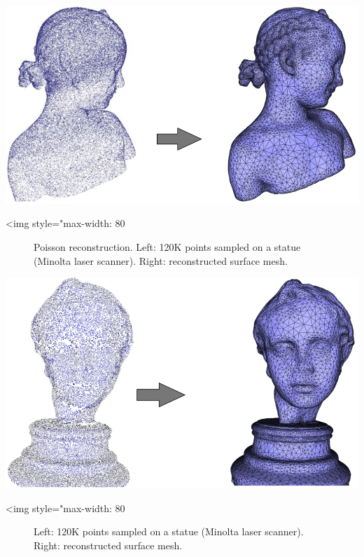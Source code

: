 \begin{center}
    \begin{ccTexOnly}
        \includegraphics[width=1.0\textwidth]{Surface_reconstruction_points_3/bimba}
    \end{ccTexOnly}
    \begin{ccHtmlOnly}
        <img style="max-width: 80%
    \end{ccHtmlOnly}
    \begin{figure}[h]
        \caption{Poisson reconstruction.
                 Left: 120K points sampled on a statue (Minolta laser scanner).
                 Right: reconstructed surface mesh.}
        \label{Surface_reconstruction_points_3-fig-bimba}
    \end{figure}
\end{center}

\begin{center}
    \begin{ccTexOnly}
        \includegraphics[width=1.0\textwidth]{Surface_reconstruction_points_3/eros}
    \end{ccTexOnly}
    \begin{ccHtmlOnly}
        <img style="max-width: 80%
    \end{ccHtmlOnly}
    \begin{figure}[h]
        \caption{Left: 120K points sampled on a statue (Minolta laser scanner).
                 Right: reconstructed surface mesh.}
        \label{Surface_reconstruction_points_3-fig-eros}
    \end{figure}
\end{center}

